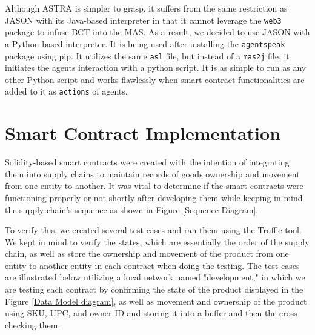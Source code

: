 \vspace{.5cm}

Although \ac{ASTRA} is simpler to grasp, it suffers from the same restriction as JASON with its Java-based interpreter in that it cannot leverage the \texttt{web3} package to infuse \ac{BCT} into the \ac{MAS}. As a result, we decided to use JASON with a Python-based interpreter. It is being used after installing the \texttt{agentspeak} package using \ac{pip}. It utilizes the same \texttt{asl} file, but instead of a \texttt{mas2j} file, it initiates the agents interaction with a python script. It is as simple to run as any other Python script and works flawlessly when smart contract functionalities are added to it as \texttt{actions} of agents.

\section{Smart Contract Implementation }

Solidity-based smart contracts were created with the intention of integrating them into supply chains to maintain records of goods ownership and movement from one entity to another. It was vital to determine if the smart contracts were functioning properly or not shortly after developing them while keeping in mind the supply chain's sequence as shown in Figure \ref{Sequence Diagram}. 

\vspace{.5cm}

To verify this, we created several test cases and ran them using the Truffle tool. We kept in mind to verify the states, which are essentially the order of the supply chain, as well as store the ownership and movement of the product from one entity to another entity in each contract when doing the testing. The test cases are illustrated below utilizing a local network named "development," in which we are testing each contract by confirming the state of the product displayed in the Figure \ref{Data Model diagram}, as well as movement and ownership of the product using \ac{SKU}, \ac{UPC}, and owner ID and storing it into a buffer and then the cross checking them.

\vspace{.5cm}

